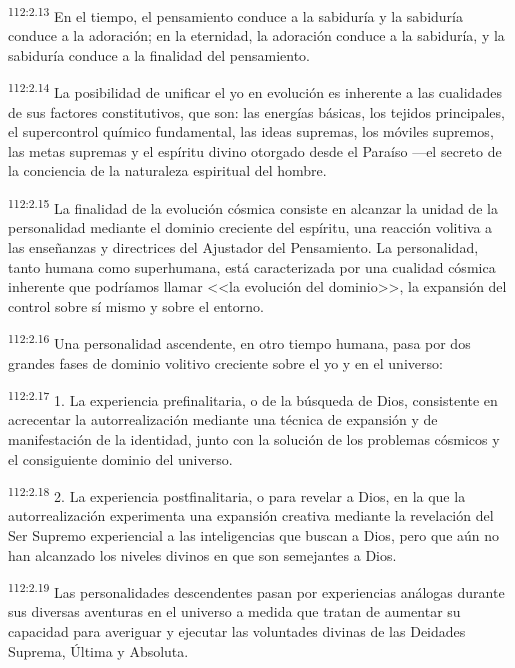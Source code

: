 \par
\textsuperscript{112:2.13} En el tiempo, el pensamiento conduce a la sabiduría y la sabiduría conduce a la adoración; en la eternidad, la adoración conduce a la sabiduría, y la sabiduría conduce a la finalidad del pensamiento.

\par
\textsuperscript{112:2.14} La posibilidad de unificar el yo en evolución es inherente a las cualidades de sus factores constitutivos, que son: las energías básicas, los tejidos principales, el supercontrol químico fundamental, las ideas supremas, los móviles supremos, las metas supremas y el espíritu divino otorgado desde el Paraíso ---el secreto de la conciencia de la naturaleza espiritual del hombre.

\par
\textsuperscript{112:2.15} La finalidad de la evolución cósmica consiste en alcanzar la unidad de la personalidad mediante el dominio creciente del espíritu, una reacción volitiva a las enseñanzas y directrices del Ajustador del Pensamiento. La personalidad, tanto humana como superhumana, está caracterizada por una cualidad cósmica inherente que podríamos llamar <<la evolución del dominio>>, la expansión del control sobre sí mismo y sobre el entorno.

\par
\textsuperscript{112:2.16} Una personalidad ascendente, en otro tiempo humana, pasa por dos grandes fases de dominio volitivo creciente sobre el yo y en el universo:

\par
\textsuperscript{112:2.17} 1. La experiencia prefinalitaria, o de la búsqueda de Dios, consistente en acrecentar la autorrealización mediante una técnica de expansión y de manifestación de la identidad, junto con la solución de los problemas cósmicos y el consiguiente dominio del universo.

\par
\textsuperscript{112:2.18} 2. La experiencia postfinalitaria, o para revelar a Dios, en la que la autorrealización experimenta una expansión creativa mediante la revelación del Ser Supremo experiencial a las inteligencias que buscan a Dios, pero que aún no han alcanzado los niveles divinos en que son semejantes a Dios.

\par
\textsuperscript{112:2.19} Las personalidades descendentes pasan por experiencias análogas durante sus diversas aventuras en el universo a medida que tratan de aumentar su capacidad para averiguar y ejecutar las voluntades divinas de las Deidades Suprema, Última y Absoluta.

